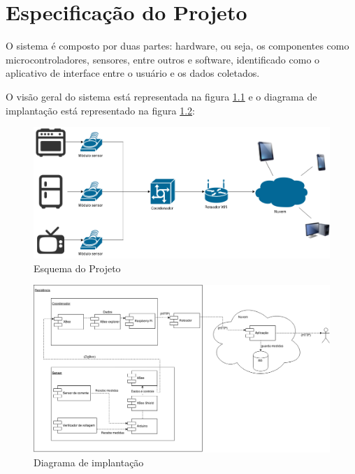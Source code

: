 \chapter{Especificação do Projeto}
\label{Cap:especificacao}

O sistema é composto por duas partes: hardware, ou seja, os componentes como microcontroladores, sensores, entre outros e software, identificado como o aplicativo de interface entre o usuário e os dados coletados.

O visão geral do sistema está representada na figura \ref{fig:esqueminha} e o diagrama de implantação está representado na figura \ref{fig:diagrama_implantacao}:

\begin{figure}[H]
\centering
\includegraphics[width=1\textwidth]{figuras/esqueminha.png}
\caption{\label{fig:esqueminha} Esquema do Projeto}
\end{figure}

\begin{figure}[H]
\centering
\includegraphics[width=1\textwidth]{figuras/diagrama_implantacao.png}
\caption{\label{fig:diagrama_implantacao} Diagrama de implantação}
\end{figure}

